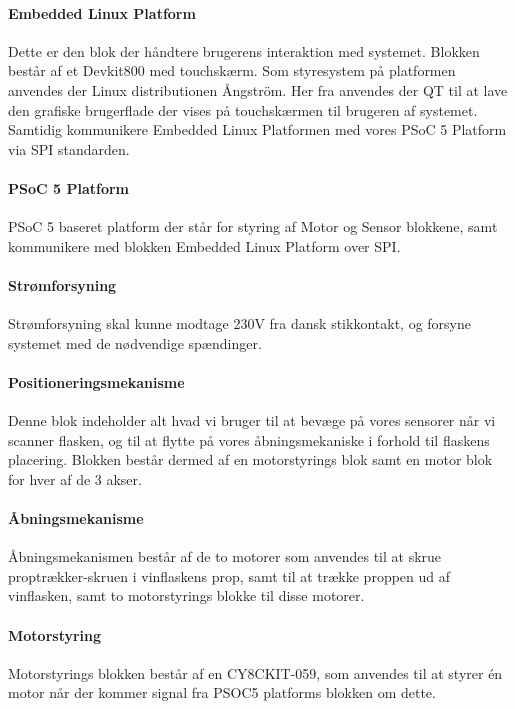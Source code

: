 \paragraph{Embedded Linux Platform} Dette er den blok der håndtere brugerens interaktion med systemet. Blokken består af et Devkit800 med touchskærm. Som styresystem på platformen anvendes der Linux distributionen Ångström. Her fra anvendes der QT til at lave den grafiske brugerflade der vises på touchskærmen til brugeren af systemet. Samtidig kommunikere Embedded Linux Platformen med vores PSoC 5 Platform via SPI standarden.

\paragraph{PSoC 5 Platform} PSoC 5 baseret platform der står for styring af Motor og Sensor blokkene, samt kommunikere med blokken Embedded Linux Platform over SPI.

\paragraph{Strømforsyning} Strømforsyning skal kunne modtage 230V fra dansk stikkontakt, og forsyne systemet med de nødvendige spændinger.

\paragraph{Positioneringsmekanisme} Denne blok indeholder alt hvad vi bruger til at bevæge på vores sensorer når vi scanner flasken, og til at flytte på vores åbningsmekaniske i forhold til flaskens placering. Blokken består dermed af en motorstyrings blok samt en motor blok for hver af de 3 akser.

\paragraph{Åbningsmekanisme} Åbningsmekanismen består af de to motorer som anvendes til at skrue proptrækker-skruen i vinflaskens prop, samt til at trække proppen ud af vinflasken, samt to motorstyrings blokke til disse motorer.

\paragraph{Motorstyring} Motorstyrings blokken består af en CY8CKIT-059, som anvendes til at styrer én motor når der kommer signal fra PSOC5 platforms blokken om dette.


